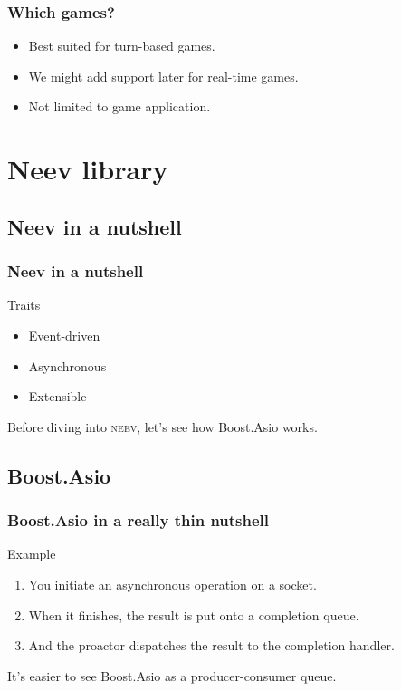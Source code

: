 \documentclass[xcolor=dvipsnames]{beamer}
\begin{document}
\begin{frame}
\frametitle{Which games?}

\begin{itemize}
\item Best suited for turn-based games.
\item We might add support later for real-time games.
\end{itemize}

\begin{itemize}
\item Not limited to game application.
\end{itemize}

\end{frame}

\section{Neev library}

\subsection{Neev in a nutshell}
\begin{frame}
\frametitle{Neev in a nutshell}

\begin{block}{Traits}
\begin{itemize}
\item Event-driven
\item Asynchronous
\item Extensible
\end{itemize}
\end{block}

Before diving into \textsc{neev}, let's see how Boost.Asio works.
\end{frame}

\subsection{Boost.Asio}

\begin{frame}
\frametitle{Boost.Asio in a really thin nutshell}

\begin{block}{Example}
\begin{enumerate}
\item You initiate an asynchronous operation on a socket.
\item When it finishes, the result is put onto a completion queue.
\item And the proactor dispatches the result to the completion handler.
\end{enumerate}
\end{block}

It's easier to see Boost.Asio as a producer-consumer queue.
\end{frame}
\end{document}
